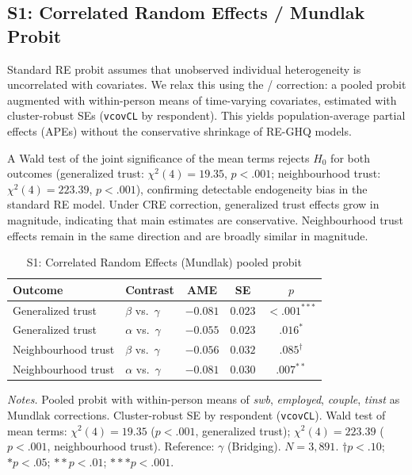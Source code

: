 \documentclass[12pt, a4paper]{article}
\newcommand{\tablenote}[1]{\vspace{4pt}\par\footnotesize\textit{Notes.} #1}
\begin{document}
\subsection{S1: Correlated Random Effects / Mundlak Probit}
\label{sec:s1}

Standard RE probit assumes that unobserved individual heterogeneity is
uncorrelated with covariates. We relax this using the
\citet{mundlak1978pooling} / \citet{wooldridge2019correlated} correction:
a pooled probit augmented with within-person means of time-varying
covariates, estimated with cluster-robust SEs (\texttt{vcovCL} by
respondent). This yields population-average partial effects (APEs) without
the conservative shrinkage of RE-GHQ models.

A Wald test of the joint significance of the mean terms rejects $H_0$
for both outcomes (generalized trust: $\chi^2(4) = 19.35$, $p < .001$;
neighbourhood trust: $\chi^2(4) = 223.39$, $p < .001$), confirming detectable
endogeneity bias in the standard RE model. Under CRE correction, generalized
trust effects grow in magnitude, indicating that main estimates are
conservative. Neighbourhood trust effects remain in the same direction and
are broadly similar in magnitude.

\begin{table}[H]
\centering
\caption{S1: Correlated Random Effects (Mundlak) pooled probit}
\label{tab:A12_cre}
\small
\begin{tabular}{llccc}
\hline\hline
  Outcome & Contrast & AME & SE & $p$ \\
\hline
  Generalized trust   & $\beta$ vs.\ $\gamma$ & $-0.081$ & $0.023$ & $<.001^{***}$ \\
  Generalized trust   & $\alpha$ vs.\ $\gamma$ & $-0.055$ & $0.023$ & $.016^{*}$ \\
  Neighbourhood trust & $\beta$ vs.\ $\gamma$ & $-0.056$ & $0.032$ & $.085^{\dagger}$ \\
  Neighbourhood trust & $\alpha$ vs.\ $\gamma$ & $-0.081$ & $0.030$ & $.007^{**}$ \\
\hline\hline
\end{tabular}
\tablenote{Pooled probit with within-person means of \textit{swb},
\textit{employed}, \textit{couple}, \textit{tinst} as Mundlak corrections.
Cluster-robust SE by respondent (\texttt{vcovCL}).
Wald test of mean terms: $\chi^2(4) = 19.35$ ($p < .001$, generalized trust);
$\chi^2(4) = 223.39$ ($p < .001$, neighbourhood trust).
Reference: $\gamma$ (Bridging). $N = 3{,}891$.
$\dagger p<.10$; $* p<.05$; $** p<.01$; $*** p<.001$.}
\end{table}
\end{document}
